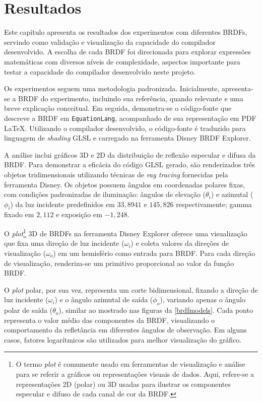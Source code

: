 \chapter{Resultados}
\label{chapter.resultados}


Este capítulo apresenta os resultados dos experimentos com diferentes BRDFs, servindo como validação e visualização da capacidade do compilador desenvolvido. A escolha de cada BRDF foi direcionada para explorar expressões matemáticas com diversos níveis de complexidade, aspectos importante para testar a capacidade do compilador desenvolvido neste projeto.

Os experimentos seguem uma metodologia padronizada. Inicialmente, apresenta-se a BRDF do experimento, incluindo sua referência, quando relevante e uma breve explicação conceitual. Em seguida, demonstra-se o código-fonte que descreve a BRDF em \texttt{EquationLang}, acompanhado de sua representação em PDF \LaTeX{}. Utilizando o compilador desenvolvido, o código-fonte é traduzido para linguagem de \textit{shading} GLSL e carregado na ferramenta Disney BRDF Explorer.

A análise inclui gráficos 3D e 2D da distribuição de reflexão especular e difusa da BRDF. Para demonstrar a eficácia do código GLSL gerado, são renderizados três objetos tridimensionais utilizando técnicas de \textit{ray tracing} fornecidas pela ferramenta Disney. Os objetos possuem ângulos em coordenadas polares fixas, com condições padronizadas de iluminação: ângulos de elevação ($\theta_i$) e azimutal ($\phi_i$) da luz incidente predefinidos em $33,8941$ e $145,826$ respectivamente; gamma fixado em $2,112$ e exposição em $-1,248$.

O \textit{plot}\footnote{O termo \textit{plot} é comumente usado em ferramentas de visualização e análise para se referir a gráficos ou representações visuais de dados. Aqui, refere-se a representações 2D (polar) ou 3D usadas para ilustrar os componentes especular e difuso de cada canal de cor da BRDF.} 3D de BRDFs na ferramenta Disney Explorer oferece uma visualização que fixa uma direção de luz incidente ($\omega_i$) e coleta valores da direções de visualização ($\omega_o$) em um hemisfério como entrada para BRDF. Para cada direção de visualização, renderiza-se um primitivo proporcional ao valor da função BRDF.

O \textit{plot} polar, por sua vez, representa um corte bidimensional, fixando a direção de luz incidente ($\omega_i$) e o ângulo azimutal de saída ($\phi_o$), variando apenas o ângulo polar de saída ($\theta_o$), similar ao mostrado nas figuras da \autoref{brdfmodels}. Cada ponto representa o valor médio das componentes da BRDF, visualizando o comportamento da refletância em diferentes ângulos de observação. Em alguns casos, fatores logarítmicos são utilizados para melhor visualização do gráfico.

